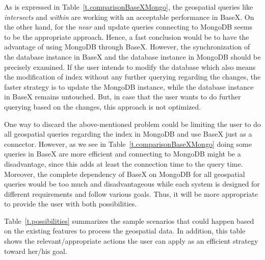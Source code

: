 \documentclass[a4paper,12pt]{article}
\begin{document}
As is expressed in Table~\ref{t.comparisonBaseXMongo}, the geospatial queries like \textit{intersects} and \textit{within} are working with an acceptable performance in BaseX. On the other hand, for the \textit{near} and update queries connecting to MongoDB seems to be the appropriate approach. Hence, a fast conclusion would be to have the advantage of using MongoDB through BaseX. However, the synchronization of the database instance in BaseX and the database instance in MongoDB should be precisely examined. If the user intends to modify the database which also means the modification of index without any further querying regarding the changes, the faster strategy is to update the MongoDB instance, while the database instance in BaseX remains untouched. But, in case that the user wants to do further querying based on the changes, this approach is not optimized.  

One way to discard the above-mentioned problem could be limiting the user to do all geospatial queries regarding the index in MongoDB and use BaseX just as a connector. 
However, as we see in Table~\ref{t.comparisonBaseXMongo} doing some queries in BaseX are more efficient and connecting to MongoDB might be a disadvantage, since this adds at least the connection time to the query time. Moreover, the complete dependency of BaseX on MongoDB for all geospatial queries would be too much and disadvantageous while each system is designed for different requirements and follow various goals. 
Thus, it will be more appropriate to provide the user with both possibilities.

Table~\ref{t.possibilities} summarizes the sample scenarios that could happen based on the existing features to process the geospatial data. In addition, this table shows the relevant/appropriate actions the user can apply as an efficient strategy toward her/his goal.


\begin{table}
\centering
{}
\caption{Possible scenarios and appropriate actions suggested to take}
\label{t.possibilities}
\end{table}
\end{document}
